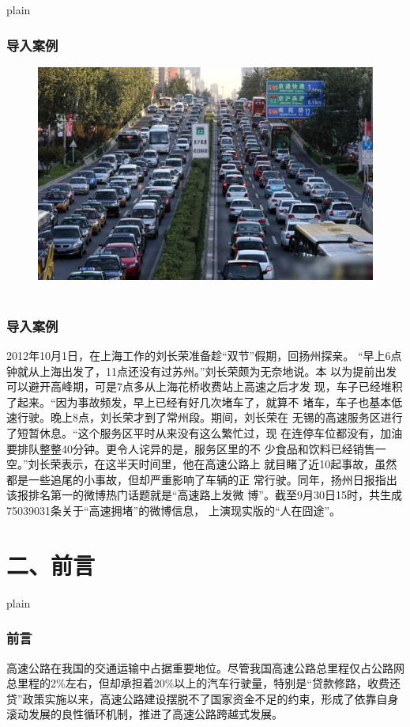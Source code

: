 \documentclass[aspectratio=169, 12pt]{beamer}
\begin{document}
\begin{frame}{plain}
    \frametitle{导入案例}
    \begin{figure}
        \centering
        \includegraphics[width=1.0\textwidth]{./resources/figure/trafic.jpg}\
    \end{figure}
\end{frame}

\begin{frame}[plain]
    \frametitle{导入案例}
    2012年10月1日，在上海工作的刘长荣准备趁“双节”假期，回扬州探亲。
“早上6点钟就从上海出发了，11点还没有过苏州。”刘长荣颇为无奈地说。本
以为提前出发可以避开高峰期，可是7点多从上海花桥收费站上高速之后才发
现，车子已经堆积了起来。“因为事故频发，早上已经有好几次堵车了，就算不
堵车，车子也基本低速行驶。晚上8点，刘长荣才到了常州段。期间，刘长荣在
无锡的高速服务区进行了短暂休息。“这个服务区平时从来没有这么繁忙过，现
在连停车位都没有，加油要排队整整40分钟。更令人诧异的是，服务区里的不
少食品和饮料已经销售一空。”刘长荣表示，在这半天时间里，他在高速公路上
就目睹了近10起事故，虽然都是一些追尾的小事故，但却严重影响了车辆的正
常行驶。同年，扬州日报指出该报排名第一的微博热门话题就是“高速路上发微
博”。截至9月30日15时，共生成75039031条关于“高速拥堵”的微博信息，
上演现实版的“人在囧途”。
\end{frame}

\section{二、前言}

\begin{frame}{plain}
    \frametitle{前言}
    高速公路在我国的交通运输中占据重要地位。尽管我国高速公路总里程仅占公路网总里程的2\%左右，但却承担着20\%以上的汽车行驶量，特别是“贷款修路，收费还贷”政策实施以来，高速公路建设摆脱不了国家资金不足的约束，形成了依靠自身滚动发展的良性循环机制，推进了高速公路跨越式发展。
\end{frame}
\end{document}
